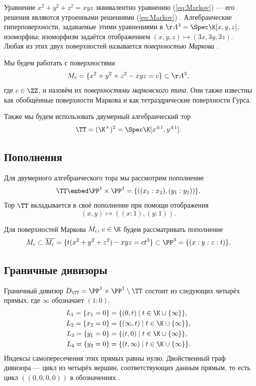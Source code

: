  
Уравнение $x^2+y^2+z^2=xyz$ эквивалентно уравнению (\ref{eq:Markov}) --- его решения являются утроенными решениями  (\ref{eq:Markov}) \cite[Proposition 2.2]{Ai13}. Алгебраические гиперповерхности, задаваемые этими уравнениями в $\AA^3=\Spec\K[x,y,z]$, изоморфны; изоморфизм задаётся отображением $(x,y,z)\mapsto(3x,3y,3z)$. Любая из этих двух поверхностей называется \emph{поверхностью Маркова} \cite{ReVi17}.

Мы будем работать с поверхностями \[M_c=\{x^2+y^2+z^2-xyz=c\}\subset\AA^3,\] где $c\in\ZZ$, и назовём их \emph{поверхностями марковского типа}. Они также известны как обобщённые поверхности Маркова и как тетраэдрические поверхности Гурса. 

Также мы будем использовать двумерный алгебраический тор
\[\TT=(\K^\times)^2=\Spec\K[x^{\pm1},y^{\pm1}].\]

\subsection{Пополнения} Для двумерного алгебраического тора  мы рассмотрим пополнение \[\TT\embed\PP^1\times\PP^1=\{((x_1:x_2),(y_1:y_2))\}.\] Тор $\TT$ вкладывается в своё пополнение при помощи отображения  \[(x,y)\mapsto ((x:1),(y:1)).\]

Для поверхностей Маркова $M_c,\, c\in\K$ будем рассматривать пополнение \[M_c\subset\overline{M_c}=\{t(x^2+y^2+z^2)-xyz=ct^3\}\subset\PP^3=\{(x:y:z:t)\}.\] 





\subsection{Граничные дивизоры}
Граничный дивизор  $D_\TT=\PP^1\times\PP^1\setminus \TT$ состоит из следующих четырёх прямых, где $\infty$ обозначает $(1:0)$.
\begin{align*}
 L_1=\{x_1=0\}&=\{(0,t)\mid t\in\K\cup\{\infty\}\},\\   
 L_2=\{x_2=0\}&=\{(\infty,t)\mid t\in\K\cup\{\infty\}\},\\
 L_3=\{y_1=0\}&=\{(t,0)\mid t\in\K\cup\{\infty\}\},\\
 L_4=\{y_2=0\}&=\{(t,\infty)\mid t\in\K\cup\{\infty\}\}.
\end{align*}
  Индексы самопересечения этих прямых равны нулю. Двойственный граф дивизора --- цикл из четырёх вершин, соответствующих данным прямым, то есть цикл $((0,0,0,0))$ в обозначениях \cite[п.2.1]{FKZ07a}.
  
